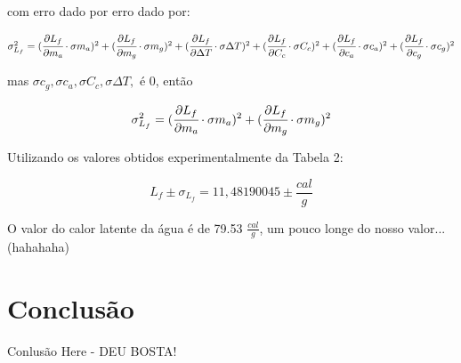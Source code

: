 \documentclass[a4paper]{article}
\begin{document}
			com erro dado por erro dado por:
			  
			$\sigma_{L_{f}}^{2} = (\cfrac{\partial L_{f}}{\partial m_a} \cdot \sigma m_{a})^2 + (\cfrac{\partial L_{f}}{\partial m_g} \cdot \sigma m_{g})^2 + (\cfrac{\partial L_{f}}{\partial \Delta T} \cdot \sigma \Delta T)^2 + (\cfrac{\partial L_{f}}{\partial C_c} \cdot \sigma C_c)^2 + (\cfrac{\partial L_{f}}{\partial c_a} \cdot \sigma c_{a})^2 + (\cfrac{\partial L_{f}}{\partial c_g} \cdot \sigma c_{g})^2$
			  
			mas $\sigma c_{g},\sigma c_{a}, \sigma C_{c}, \sigma \Delta T,$ é 0, então
			
			\begin{equation}  
				\sigma_{L_{f}}^{2} = (\cfrac{\partial L_{f}}{\partial m_a} \cdot \sigma m_{a})^2 + (\cfrac{\partial L_{f}}{\partial m_g} \cdot \sigma m_{g})^2
			\end{equation}
			
			Utilizando os valores obtidos experimentalmente da Tabela 2:
			  
			  $$L_{f}\pm\sigma_{L_{f}} = 11,48190045\pm \frac{cal}{g}$$
			  
			O valor do calor latente da água é de 79.53 $\frac{cal}{g}$, um pouco longe do nosso valor...(hahahaha)
			  
			
	\section{Conclusão}

		Conlusão Here - DEU BOSTA!
\end{document}
